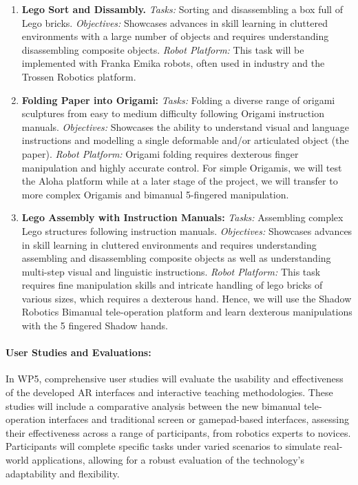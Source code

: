 \documentclass{erc-B2}
\begin{document}
\begin{enumerate}
    \item \textbf{Lego Sort and  Dissambly.} 
    \textit{Tasks:} Sorting and disassembling a box full of Lego bricks.
    \textit{Objectives:} Showcases advances in skill learning in cluttered environments with a large number of objects and requires understanding disassembling composite objects.
    \textit{Robot Platform:} This task will be implemented with Franka Emika robots, often used in industry and the Trossen Robotics platform. 

    \item \textbf{Folding Paper into Origami:}
        \textit{Tasks:} Folding a diverse range of origami sculptures from easy to medium difficulty  following Origami instruction manuals.
        \textit{Objectives:} Showcases the ability to understand visual and language instructions and modelling  a single deformable and/or articulated object (the paper).
        \textit{Robot Platform:} Origami folding requires dexterous finger manipulation and highly accurate control. For simple Origamis, we will test the Aloha platform while at a later stage of the project, we will transfer to more complex Origamis and bimanual 5-fingered manipulation. 

    \item \textbf{Lego Assembly with Instruction Manuals:}
         \textit{Tasks:} Assembling complex Lego structures following instruction manuals.
         \textit{Objectives:} Showcases advances in skill learning in cluttered environments and requires understanding assembling and disassembling composite objects as well as understanding multi-step visual and linguistic instructions.
         \textit{Robot Platform:} This task requires fine manipulation skills and intricate handling of lego bricks of various sizes, which requires a dexterous hand. Hence, we will use the Shadow Robotics Bimanual tele-operation platform and learn dexterous manipulations with the 5 fingered Shadow hands. 
\end{enumerate}

\paragraph{User Studies and Evaluations:}
In WP5, comprehensive user studies will evaluate the usability and effectiveness of the developed AR interfaces and interactive teaching methodologies. These studies will include a comparative analysis between the new bimanual tele-operation interfaces and traditional screen or gamepad-based interfaces, assessing their effectiveness across a range of participants, from robotics experts to novices. Participants will complete specific tasks under varied scenarios to simulate real-world applications, allowing for a robust evaluation of the technology's adaptability and flexibility.
\end{document}
